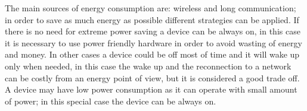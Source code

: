 	The main sources of energy consumption are: wireless and long communication; in order to save as much energy as possible different strategies can be applied.\newline
	If there is no need for extreme power saving a device can be always on, in this case it is necessary to use power friendly hardware in order to avoid wasting of energy and money.\newline
	In other cases a device could be off most of time and it will wake up only when needed, in this case the wake up and the reconnection to a network can be costly from an energy point of view, but it is considered a good trade off.\newline
	A device may have low power consumption as it can operate with small amount of power; in this special case the device can be always on.